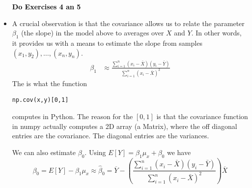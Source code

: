\begin{itemize}
\vspace{1cm}
\begin{center}
\textcolor{black}{{\bf \Huge Do Exercises 4 an 5}}
\end{center}
\vspace{1cm}


\item A crucial observation is that the covariance allows us to relate the parameter $\beta_1$ (the slope) in the model above to averages over $X$ and $Y$. In other words, it provides us with a means to estimate the slope from samples $(x_1,y_2),\dots,(x_n,y_n)$. 
\begin{align*}
 \beta_1 &\approx  \frac{\sum_{i=1}^n\left(x_i - \bar{X}\right)\left(y_i-\bar{Y}\right)}{\sum_{i=1}^n\left(x_i - \bar{X}\right)^2}
\end{align*}
The is what the function 
\begin{Verbatim}
np.cov(x,y)[0,1]
\end{Verbatim}
computes in Python. 
The reason for the $[0,1]$ is that the covariance function in numpy actually computes a 2D array (a Matrix), where the off diagonal entries are the covariance. The diagonal entries are the variances. 

We can also estimate $\beta_0$. Using $E[Y] = \beta_1 \mu_x + \beta_0$ we have
\begin{equation*}
\beta_0 =  E[Y]  - \beta_1 \mu_x \approx \hat{\beta}_0 =  \overline{Y} - \left(\frac{\sum_{i=1}^n\left(x_i - \bar{X}\right)\left(y_i-\bar{Y}\right)}{\sum_{i=1}^n\left(x_i - \bar{X}\right)^2}\right)\overline{X}
\end{equation*}


\end{itemize}

